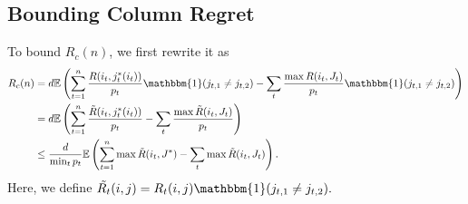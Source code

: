 \subsection*{Bounding Column Regret}
To bound $R_c(n)$, we first rewrite it as 
\begin{align*}
R_c(n) &=  d \E \left( \sum_{t = 1}^{n} \frac{R(i_t,j^*_t(i_t))}{p_t} \mathbbm{1}(j_{t,1} \neq j_{t,2}) - \sum_{t} \frac{\max R(i_t,J_t)}{p_t} \mathbbm{1}(j_{t,1} \neq j_{t,2})  \right) \\
&=  d \E \left( \sum_{t = 1}^{n} \frac{\tilde{R}(i_t,j^*_t(i_t))}{p_t}  - \sum_{t} \frac{\max \tilde{R}(i_t,J_t)}{p_t}   \right) \\
&\leq  \frac{d}{\min_t p_t} \E \left( \sum_{t = 1}^{n} \max \tilde{R}(i_t,J^*)  - \sum_{t} \max \tilde{R}(i_t,J_t)   \right).
\end{align*}
Here, we define $ \tilde{R_t}(i,j) = R_t(i,j)\mathbbm{1}(j_{t,1} \neq j_{t,2}) .$ 
%
%
%
